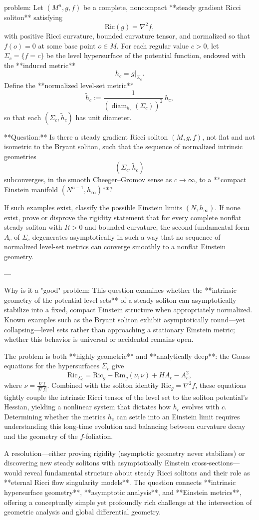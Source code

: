 problem:  
Let \((M^n, g, f)\) be a complete, noncompact **steady gradient Ricci soliton** satisfying  
\[
\mathrm{Ric}(g) = \nabla^2 f,
\]
with positive Ricci curvature, bounded curvature tensor, and normalized so that \(f(o)=0\) at some base point \(o\in M\).  
For each regular value \(c > 0\), let \(\Sigma_c = \{ f = c \}\) be the level hypersurface of the potential function, endowed with the **induced metric**  
\[
h_c = g|_{\Sigma_c}.
\]  
Define the **normalized level-set metric**  
\[
\tilde{h}_c := \frac{1}{(\operatorname{diam}_{h_c}(\Sigma_c))^2}\, h_c,
\]
so that each \((\Sigma_c, \tilde{h}_c)\) has unit diameter.

**Question:**  
Is there a steady gradient Ricci soliton \((M,g,f)\), not flat and not isometric to the Bryant soliton, such that the sequence of normalized intrinsic geometries  
\[
(\Sigma_c, \tilde{h}_c)
\]
subconverges, in the smooth Cheeger–Gromov sense as \(c\to\infty\), to a **compact Einstein manifold \((N^{n-1}, h_\infty)\)**?  

If such examples exist, classify the possible Einstein limits \((N,h_\infty)\).  
If none exist, prove or disprove the rigidity statement that for every complete nonflat steady soliton with \(R>0\) and bounded curvature, the second fundamental form \(A_c\) of \(\Sigma_c\) degenerates asymptotically in such a way that no sequence of normalized level-set metrics can converge smoothly to a nonflat Einstein geometry.

---

Why is it a "good" problem:  
This question examines whether the **intrinsic geometry of the potential level sets** of a steady soliton can asymptotically stabilize into a fixed, compact Einstein structure when appropriately normalized.  Known examples such as the Bryant soliton exhibit asymptotically round—yet collapsing—level sets rather than approaching a stationary Einstein metric; whether this behavior is universal or accidental remains open.  

The problem is both **highly geometric** and **analytically deep**: the Gauss equations for the hypersurfaces \(\Sigma_c\) give
\[
\mathrm{Ric}_{\Sigma_c} = \mathrm{Ric}_g - \mathrm{Rm}_g(\nu,\nu) + H A_c - A_c^2,
\]
where \(\nu = \frac{\nabla f}{|\nabla f|}\).  Combined with the soliton identity \(\mathrm{Ric}_g = \nabla^2 f\), these equations tightly couple the intrinsic Ricci tensor of the level set to the soliton potential’s Hessian, yielding a nonlinear system that dictates how \(h_c\) evolves with \(c\).  Determining whether the metrics \(h_c\) can settle into an Einstein limit requires understanding this long‑time evolution and balancing between curvature decay and the geometry of the \(f\)-foliation.  

A resolution—either proving rigidity (asymptotic geometry never stabilizes) or discovering new steady solitons with asymptotically Einstein cross‑sections—would reveal fundamental structure about steady Ricci solitons and their role as **eternal Ricci flow singularity models**.  The question connects **intrinsic hypersurface geometry**, **asymptotic analysis**, and **Einstein metrics**, offering a conceptually simple yet profoundly rich challenge at the intersection of geometric analysis and global differential geometry.